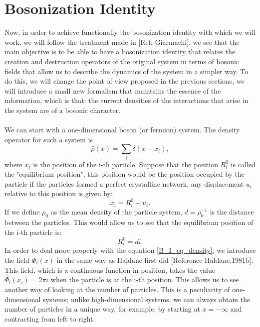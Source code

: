 \section{Bosonization Identity}
Now, in order to achieve functionally the bosonization identity with which we will work, we will follow the treatment made in [Ref: Giarmachi], we see that the main objective is to be able to have a bosonization identity that relates the creation and destruction operators of the original system in terms of bosonic fields that allow us to describe the dynamics of the system in a simpler way. To do this, we will change the point of view proposed in the previous sections, we will introduce a small new formalism that maintains the essence of the information, which is that: the current densities of the interactions that arise in the system are of a bosonic character.\\ \\
We can start with a one-dimensional boson (or fermion) system. The density operator for such a system is
\begin{equation} \label{B_I_eq_density}
    \hat{\rho}(x)=\sum_{i} \delta(x-x_{i}),
\end{equation}
where $x_{i}$ is the position of the i-th particle. Suppose that the position $R_{i}^{0}$ is called the "equilibrium position", this position would be the position occupied by the particle if the particles formed a perfect crystalline network, any displacement $u_{i}$ relative to this position is given by:
\begin{equation} \label{2_3_2}
    x_{i}=R_{i}^{0} + u_{i}.
\end{equation}
If we define $\rho_{0}$ as the mean density of the particle system, $d=\rho_{0}^{-1}$ is the distance between the particles. This would allow us to see that the equilibrium position of the i-th particle is:
\begin{equation}\label{2_3_3}
   R_{i}^{0}=di. 
\end{equation}
In order to deal more properly with the equation \eqref{B_I_eq_density}, we introduce the field $\Phi_{l}(x)$ in the same way as Haldane first did [Reference Haldane,1981b]. This field, which is a continuous function in position, takes the value $\hat{\Phi}_{l}(x_{i})=2\pi i$ when the particle is at the i-th position. This allows us to see another way of looking at the number of particles. This is a peculiarity of one-dimensional systems; unlike high-dimensional systems, we can always obtain the number of particles in a unique way, for example, by starting at $x= - \infty$ and contracting from left to right.\\ \\

